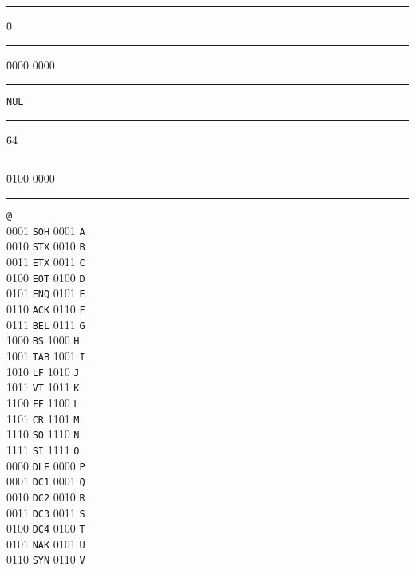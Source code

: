 \small \normalsize %
\begin{tabbing}
\rule{24pt}{0pt} \=0 \rule{24pt}{0pt} \=0000 0000  \rule{24pt}{0pt} \=\verb+NUL+  \rule{50pt}{0pt} \=64 \rule{24pt}{0pt} \=0100 0000 \rule{24pt}{0pt} \=\verb+@+  \\ 
  0001 \>\verb+SOH+     0001 \>\verb+A+  \\ 
  0010 \>\verb+STX+     0010 \>\verb+B+  \\ 
  0011 \>\verb+ETX+     0011 \>\verb+C+  \\ 
  0100 \>\verb+EOT+     0100 \>\verb+D+  \\ 
  0101 \>\verb+ENQ+     0101 \>\verb+E+  \\ 
  0110 \>\verb+ACK+     0110 \>\verb+F+  \\ 
  0111 \>\verb+BEL+     0111 \>\verb+G+  \\ 
  1000 \>\verb+BS+      1000 \>\verb+H+  \\ 
  1001 \>\verb+TAB+     1001 \>\verb+I+  \\ 
  1010 \>\verb+LF+     1010 \>\verb+J+  \\ 
  1011 \>\verb+VT+     1011 \>\verb+K+  \\ 
  1100 \>\verb+FF+     1100 \>\verb+L+  \\ 
  1101 \>\verb+CR+     1101 \>\verb+M+  \\ 
  1110 \>\verb+SO+     1110 \>\verb+N+  \\ 
  1111 \>\verb+SI+     1111 \>\verb+O+  \\ 
  0000 \>\verb+DLE+    0000 \>\verb+P+  \\ 
  0001 \>\verb+DC1+    0001 \>\verb+Q+  \\ 
  0010 \>\verb+DC2+    0010 \>\verb+R+  \\ 
  0011 \>\verb+DC3+    0011 \>\verb+S+  \\ 
  0100 \>\verb+DC4+    0100 \>\verb+T+  \\ 
  0101 \>\verb+NAK+    0101 \>\verb+U+  \\ 
  0110 \>\verb+SYN+    0110 \>\verb+V+  \\ 

\end{tabbing}
